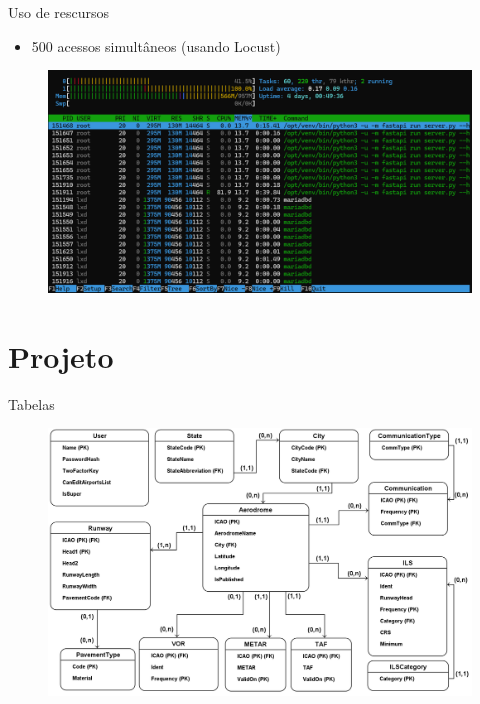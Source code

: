 \documentclass{beamer}
\begin{document}
\begin{frame}{Uso de rescursos}
    \begin{itemize}
        \item 500 acessos simultâneos (usando Locust)
    \end{itemize}
    \pause
    
    \begin{figure}[ht]
        \begin{center}
        \includegraphics[width=0.8\linewidth]{img/server-500-acessos.png}
        \label{fig:arquitetura}
        \end{center}
    \end{figure}
\end{frame}


\section{Projeto}

\begin{frame}{Tabelas}
    \begin{figure}[ht]
        \begin{center}
        \includegraphics[width=0.8\linewidth]{img/ERAero.png}
        \label{fig:arquitetura}
        \end{center}
    \end{figure}
\end{frame}
\end{document}
